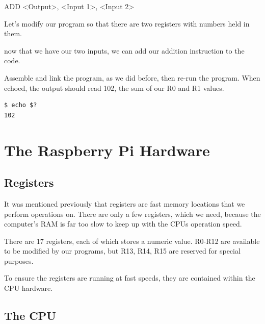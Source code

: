 \documentclass[a4paper, twocolumn, twoside, 11pt]{article}
\begin{document}
			ADD <Output>, <Input 1>, <Input 2>
		
			Let's modify our program so that there are two registers with numbers held in them.
		
			
		
			now that we have our two inputs, we can add our addition instruction to the code.
		
			
		
			Assemble and link the program, as we did before, then re-run the program. When echoed, the output should read 102, the sum of our R0 and R1 values.
		
			\begin{lstlisting}
$ echo $?
102
			\end{lstlisting}
		
	\section{The Raspberry Pi Hardware}
	
		\subsection*{Registers}
	
			It was mentioned previously that registers are fast memory locations that we perform operations on. There are only a few registers, which we need, because the computer's RAM is far too slow to keep up with the CPUs operation speed.
		
			There are 17 registers, each of which stores a numeric value. R0-R12 are available to be modified by our programs, but R13, R14, R15 are reserved for special purposes.
			
			To ensure the registers are running at fast speeds, they are contained within the CPU hardware.
	
		\subsection*{The CPU}
		
\end{document}
